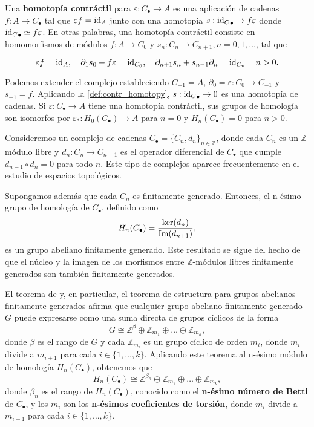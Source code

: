 \begin{definicion}
	\label{def:contr_homotopy} Una \textbf{homotopía contráctil} para
	\(\varepsilon: C_{\bullet}\to A\) es una aplicación de cadenas
	\(f: A \to C_{\bullet}\) tal que \(\varepsilon f = \operatorname{id}_{A}\) junto con una
	homotopía \(s:{\operatorname{id}_C}_{\bullet}\rightarrow f \varepsilon\) donde
	\({\operatorname{id}_C}_{\bullet}\simeq f \varepsilon\). En otras palabras, una homotopía
	contráctil consiste en homomorfismos de módulos \(f: A \to C_{0}\) y
	\(s_{n}: C_{n}\to C_{n+1}, n = 0, 1, \ldots\), tal que
	
	\[
	\varepsilon f = \operatorname{id}_{A}, \quad \partial_{1}s_{0}+ f \varepsilon = \operatorname{id}_{C_0},
	\quad \partial_{n+1}s_{n}+ s_{n-1}\partial_{n}= \operatorname{id}_{C_n}\quad n > 0.
	\]
\end{definicion}

Podemos extender el complejo estableciendo \(C_{-1}= A\), \(\partial_{0}= \varepsilon
: C_{0}\to C_{-1}\) y \(s_{-1}= f\). Aplicando la \autoref{def:contr_homotopy}, \(s:{\operatorname{id}_C}
_{\bullet}\rightarrow 0\) es una homotopía de cadenas. Si
\(\varepsilon: C_{\bullet}\to A\) tiene una homotopía contráctil, sus grupos de homología
son isomorfos por \(\varepsilon_{*}: H_{0}(C_{\bullet}) \rightarrow A\) para \(n = 0\)
y \(H_{n}(C_{\bullet}) = 0\) para \(n > 0\).

Consideremos un complejo de cadenas \(C_{\bullet}= \{ C_{n}, d_{n}\}_{n \in
	\mathbb{Z}}\), donde cada \(C_{n}\) es un \(\mathbb{Z}\)-módulo libre y
\(d_{n}: C_{n}\to C_{n-1}\) es el operador diferencial de \(C_{\bullet}\) que cumple
\(d_{n-1}\circ d_{n}= 0\) para todo \(n\). Este tipo de complejos aparece frecuentemente
en el estudio de espacios topológicos.

Supongamos además que cada \(C_{n}\) es finitamente generado. Entonces, el n-ésimo
grupo de homología de \(C_{\bullet}\), definido como
\[
H_{n}(C_{\bullet}) = \frac{\ker(d_{n})}{\operatorname{Im}(d_{n+1})},
\]
es un grupo abeliano finitamente generado. Este resultado se sigue del hecho de que
el núcleo y la imagen de los morfismos entre \(\mathbb{Z}\)-módulos libres finitamente
generados son también finitamente generados.

El teorema de  y, en particular, el teorema de
estructura para grupos abelianos finitamente generados afirma que cualquier
grupo abeliano finitamente generado \(G\) puede expresarse como una suma directa
de grupos cíclicos de la forma
\[
G \cong \mathbb{Z}^{\beta}\oplus \mathbb{Z}_{m_1}\oplus \ldots \oplus \mathbb{Z}
_{m_k},
\]
donde \(\beta\) es el rango de \(G\) y cada \(\mathbb{Z}_{m_i}\) es un grupo cíclico
de orden \(m_{i}\), donde \(m_{i}\) divide a \(m_{i+1}\) para cada \(i \in \{1, \ldots,
k\}\). Aplicando este teorema al n-ésimo módulo de homología \(H_{n}(C_{\bullet})\),
obtenemos que
\[
H_{n}(C_{\bullet}) \cong \mathbb{Z}^{\beta_n}\oplus \mathbb{Z}_{m_1}\oplus \ldots
\oplus \mathbb{Z}_{m_k},
\]
donde \(\beta_{n}\) es el rango de \(H_{n}(C_{\bullet})\), conocido como el \textbf{n-ésimo
	número de Betti} de \(C_{\bullet}\), y los \(m_{i}\) son los \textbf{n-ésimos
	coeficientes de torsión}, donde \(m_{i}\) divide a \(m_{i+1}\) para cada
\(i \in \{1, \ldots, k\}\).

